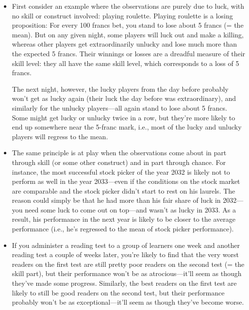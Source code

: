 \documentclass[a4paper]{tufte-book}\usepackage[]{graphicx}\usepackage[]{xcolor}
\begin{document}
\begin{itemize}
\item First consider an example where the observations are purely due to luck,
with no skill or construct involved: playing roulette. Playing roulette
is a losing proposition: For every 100 francs bet, you stand to lose about 5
francs (= the mean). But on any given night, some players will luck out and
make a killing, whereas other players get extraordinarily unlucky and lose much
more than the expected 5 francs. Their winnings or losses are a dreadful measure
of their skill level: they all have the same skill level, which corresponds
to a loss of 5 francs.

The next night, however, the lucky players from the
day before probably won't get as lucky again (their luck the day before was
extraordinary), and similarly for the unlucky players---all again stand to
lose about 5 francs. Some might get lucky or unlucky twice in a
row, but they're more likely to end up somewhere near the 5-franc mark, i.e., most
of the lucky and unlucky players will regress to the mean.

\item The same principle is at play when the observations come about in part through
skill (or some other construct) and in part through chance.
For instance, the most successful stock picker of the year 2032 is likely
 not to perform as well in the year 2033---even if the conditions
 on the stock market are comparable and the stock picker didn't start to 
 rest on his laurels. The reason could simply be that he had more
 than his fair share of luck in 2032---you need some luck to 
 come out on top---and wasn't as lucky in 2033. As a result,
 his performance in the next year is likely to be closer to the
 average performance (i.e., he's regressed to the mean of stock
 picker performance).
 
 \item If you administer a reading test to a group of learners
 one week and another reading test a couple of weeks later,
 you're likely to find that the very worst readers on the first test
 are still pretty poor readers on the second test (= the skill part),
 but their performance won't be as atrocious---it'll seem as though
 they've made some progress. Similarly, the best readers on the first
 test are likely to still be good readers on the second test, but
 their performance probably won't be as exceptional---it'll seem as
 though they've become worse.
 

\end{itemize}
\end{document}
